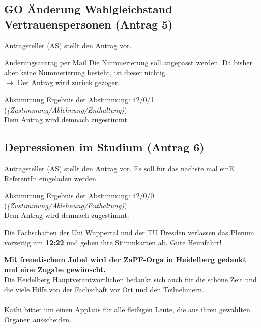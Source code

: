   \subsection{GO Änderung Wahlgleichstand Vertrauenspersonen (Antrag 5)}
    Antragsteller (AS) stellt den Antrag vor. \\
    \begin{danger}{Änderungsantrag per Mail}
      Die Nummerierung soll angepasst werden. Da bisher aber keine Nummerierung besteht, ist dieser nichtig. \\
      $\rightarrow$ Der Antrag wird zurück gezogen.
    \end{danger}

    \begin{success}{Abstimmung}
      Ergebnis der Abstimmung: 42/0/1 (\textit{(Zustimmung/Ablehnung/Enthaltung)}) \\
      Dem Antrag wird demnach zugestimmt.
    \end{success}

  \subsection{Depressionen im Studium (Antrag 6)}
    Antragsteller (AS) stellt den Antrag vor. Es soll für das nächste mal einE ReferentIn eingeladen werden.\\

    \begin{success}{Abstimmung}
      Ergebnis der Abstimmung: 42/0/0 (\textit{(Zustimmung/Ablehnung/Enthaltung)}) \\
      Dem Antrag wird demnach zugestimmt.
    \end{success}

    \begin{info}{}
      Die Fachschaften der Uni Wuppertal und der TU Dresden verlassen das Plenum vorzeitig um \textbf{12:22} und geben ihre Stimmkarten ab. Gute Heimfahrt!
    \end{info}

    \textbf{Mit frenetischem Jubel wird der ZaPF-Orga in Heidelberg gedankt und eine Zugabe gewünscht.} \\
    Die Heidelberg Hauptverantwortlichen bedankt sich auch für die schöne Zeit und die viele Hilfe von der Fachschaft vor Ort und den Teilnehmern. \\ \\
    Kathi bittet um einen Applaus für alle fleißigen Leute, die aus ihren gewählten Organen ausscheiden.

